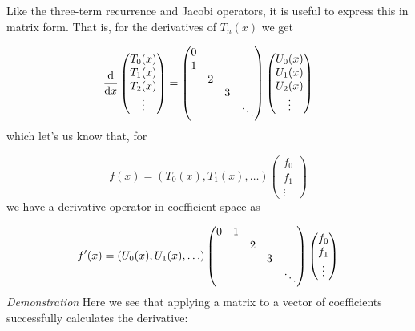 \documentclass[12pt,landscape]{article}
\def\D{ {\rm d} }
\def\dx{\D x}
\begin{document}
{Like the three-term recurrence and Jacobi operators, it is useful to express this in matrix form. That is, for the derivatives of $T_n(x)$ we get

\[
{\D \over \dx}  \begin{pmatrix} T_0(x) \\ T_1(x) \\ T_2(x) \\ \vdots \end{pmatrix}= \begin{pmatrix}
0 \cr
1 \cr
& 2 \cr
&& 3 \cr
&&&\ddots
\end{pmatrix} \begin{pmatrix} U_0(x) \\ U_1(x) \\ U_2(x) \\ \vdots \end{pmatrix}
\]
which let's us know that, for

\[
f(x) = (T_0(x),T_1(x),\ldots) \begin{pmatrix} f_0\\f_1\\\vdots \end{pmatrix}
\]
we have a derivative operator in coefficient space as

\[
f'(x) = (U_0(x),U_1(x),\ldots)\begin{pmatrix}
0 & 1 \cr
&& 2 \cr
&&& 3 \cr
&&&&\ddots
\end{pmatrix}  \begin{pmatrix} f_0\\f_1\\\vdots \end{pmatrix}
\]
\newpage
\emph{Demonstration} Here we see that applying a matrix to a vector of coefficients successfully calculates the derivative:


}
\end{document}
